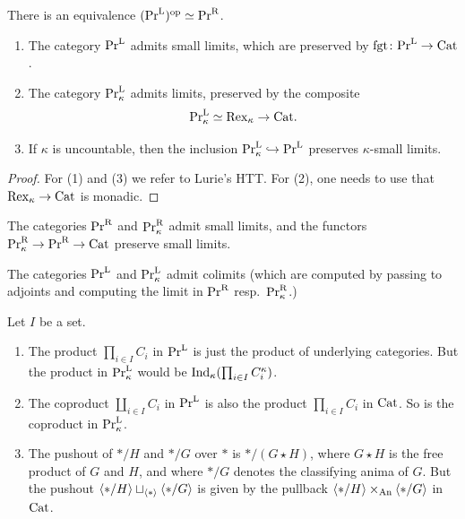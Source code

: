 \documentclass[11pt]{book}
\begin{document}
	\begin{corollary}
		There is an equivalence $(\textup{Pr}^{\textup{L}})^{\textup{op}} \simeq \textup{Pr}^{\textup{R}}$.
	\end{corollary}

	\begin{proposition}
		\begin{enumerate}
			\item The category $\textup{Pr}^{\textup{L}}$ admits small limits, which are preserved by $\operatorname{fgt}\colon \textup{Pr}^{\textup{L}} \to {\textup{Cat}}$.
			\item The category $\textup{Pr}^{\textup{L}}_{\kappa}$ admits limits, preserved by the composite
			\[
				\textup{Pr}^{\textup{L}}_{\kappa} \simeq \operatorname{Rex}_{\kappa} \to {\textup{Cat}}.
			\]
			\item If $\kappa$ is uncountable, then the inclusion $\textup{Pr}^{\textup{L}}_{\kappa} \hookrightarrow \textup{Pr}^{\textup{L}}$ preserves $\kappa$-small limits.
		\end{enumerate}
	\end{proposition}

	\begin{proof}
		For (1) and (3) we refer to Lurie's HTT. For (2), one needs to use that $\operatorname{Rex}_{\kappa} \to {\textup{Cat}}$ is monadic.
	\end{proof}

	\begin{proposition}
		The categories $\textup{Pr}^{\textup{R}}$ and $\textup{Pr}^{\textup{R}}_{\kappa}$ admit small limits, and the functors $\textup{Pr}^{\textup{R}}_{\kappa} \to \textup{Pr}^{\textup{R}} \to {\textup{Cat}}$ preserve small limits.
	\end{proposition}

	\begin{corollary}
		The categories $\textup{Pr}^{\textup{L}}$ and $\textup{Pr}^{\textup{L}}_{\kappa}$ admit colimits (which are computed by passing to adjoints and computing the limit in $\textup{Pr}^{\textup{R}}$ resp.\ $\textup{Pr}^{\textup{R}}_{\kappa}$.)
	\end{corollary}

	\begin{example}
		Let $I$ be a set.
		\begin{enumerate}
			\item The product $\prod_{i \in I} C_i$ in $\textup{Pr}^{\textup{L}}$ is just the product of underlying categories. But the product in $\textup{Pr}^{\textup{L}}_{\kappa}$ would be $\operatorname{Ind}_{\kappa}(\prod_{i \in I} C_i^{\kappa})$.
			\item The coproduct $\coprod_{i \in I} C_i$ in $\textup{Pr}^{\textup{L}}$ is also the product $\prod_{i \in I} C_i$ in ${\textup{Cat}}$. So is the coproduct in $\textup{Pr}^{\textup{L}}_{\kappa}$.
			\item The pushout of $*/H$ and $*/G$ over $*$ is $*/(G \star H)$, where $G \star H$ is the free product of $G$ and $H$, and where $*/G$ denotes the classifying anima of $G$. But the pushout $\langle */H \rangle \sqcup_{\langle * \rangle} \langle */G \rangle$ is given by the pullback $\langle */H \rangle \times_{{\textup{An}}} \langle */G \rangle$ in ${\textup{Cat}}$.
		\end{enumerate}
	\end{example}
\end{document}
